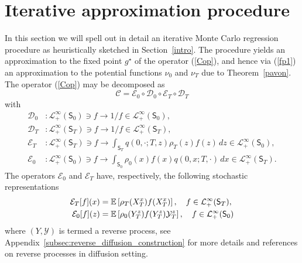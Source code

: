 \documentclass[a4paper,11pt]{amsart}
\theoremstyle{plain}
\theoremstyle{remark}
\begin{document}
\section{Iterative approximation procedure}
\label{sec:aip}
In this section we will spell out in detail an iterative Monte Carlo regression procedure 
as heuristically sketched in Section~\ref{intro}. The procedure yields
an  
approximation to the fixed point $g^\star$ of the operator (\ref{Cop}), and hence  via (\ref{fp1}) an approximation to the potential functions $\nu_0$ and $\nu_T$ due to Theorem~\ref{pavon}.
The operator (\ref{Cop}) may be decomposed as%
\begin{equation}
\mathcal{C}=\mathcal{E}_{0}\circ\mathcal{D}_{0}\circ\mathcal{E}_{T}%
\circ\mathcal{D}_{T}\label{cdec}%
\end{equation}%
 with
\begin{align*}
\mathcal{D}_{0}  &  :\mathcal{L}_{+}^{\infty}(\mathsf{S}_{0})\ni f\rightarrow
1/f\in\mathcal{L}_{+}^{\infty}(\mathsf{S}_{0}),\\
\mathcal{D}_{T}  &  :\mathcal{L}_{+}^{\infty}(\mathsf{S}_{T})\ni f\rightarrow
1/f\in\mathcal{L}_{+}^{\infty}(\mathsf{S}_{T}),\\
\mathcal{E}_{T}  &  :\mathcal{L}_{+}^{\infty}(\mathsf{S}_{T})\ni f\rightarrow
\int_{\mathsf{S}_{T}}q(0,\cdot;T,z)\rho_{T}(z)f(z)\, dz\in\mathcal{L}_{+}^{\infty}%
(\mathsf{S}_{0}),\\
\mathcal{E}_{0}  &  :\mathcal{L}_{+}^{\infty}(\mathsf{S}_{0})\ni f\rightarrow
\int_{\mathsf{S}_{0}}\rho_{0}(x)f(x)q(0,x;T,\cdot)\, dx\in\mathcal{L}_{+}^{\infty}(\mathsf{S}_{T}).
\end{align*}
The operators $\mathcal{E}_{0}$ and $\mathcal{E}_{T}$ have, respectively, the
following stochastic representations 
\begin{align}
\mathcal{E}_{T}[f](x)  &  =\mathbb{E}\left[  \rho_{T}(X_{T}^{x})f(X_{T}%
^{x})\right]  ,\text{ \ \ }f\in\mathcal{L}_{+}^{\infty}(\mathsf{S}_{T}),
\notag \\
\mathcal{E}_{0}[f](z)  &  =\mathbb{E}\left[  \rho_{0}(Y_{T}^{z})f(Y_{T}%
^{z})\mathcal{Y}_{T}^{z}\right]  ,\text{ \ \ }f\in\mathcal{L}_{+}^{\infty
}(\mathsf{S}_{0})\notag \label{e0reverse}
\end{align}
where \((Y,\mathcal{Y})\) is termed a {reverse process}, see Appendix~\ref{subsec:reverse_diffusion_construction} for more details and references on reverse processes in diffusion setting. %
\end{document}
